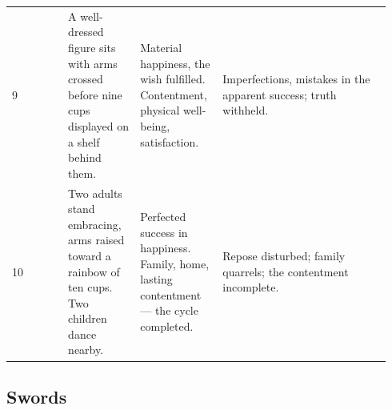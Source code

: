 \begin{longtable}[]{@{}>{\RaggedRight\small}p{0.14\linewidth}>{\RaggedRight\small}p{0.18\linewidth}>{\RaggedRight\small}p{0.20\linewidth}>{\RaggedRight\small}p{0.42\linewidth}@{}}
9 & A well-dressed figure sits with arms crossed before nine cups displayed on a shelf behind them. & Material happiness, the wish fulfilled. Contentment, physical well-being, satisfaction. & Imperfections, mistakes in the apparent success; truth withheld. \\
10 & Two adults stand embracing, arms raised toward a rainbow of ten cups. Two children dance nearby. & Perfected success in happiness. Family, home, lasting contentment --- the cycle completed. & Repose disturbed; family quarrels; the contentment incomplete. \\
\end{longtable}

\subsection{Swords}\label{swords}

